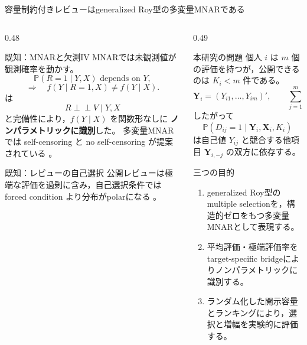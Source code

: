 \documentclass[aspectratio=169,10pt]{beamer}
\newcommand{\Prb}{\mathbb{P}}
\newcommand{\1}{\mathbf{1}}
\newcommand{\indep}{\mathrel{\perp\!\!\!\perp}}
\newcommand{\Y}{\bm{Y}}
\newcommand{\X}{\bm{X}}
\begin{document}
\begin{frame}[shrink=6]{容量制約付きレビューはgeneralized Roy型の多変量MNARである}
\begin{columns}[T,onlytextwidth]
\begin{column}{0.48\textwidth}
\begin{block}{既知：MNARと欠測IV}
\scriptsize
MNARでは未観測値が観測確率を動かす。
\[
\Prb(R=1\mid Y,X)\text{ depends on }Y,
\]
\[
\Rightarrow\quad f(Y\mid R=1,X)\ne f(Y\mid X).
\]
\textcite{dHaultfoeuille2010} は
\[
R\indep V\mid Y,X
\]
と完備性により，$f(Y\mid X)$ を関数形なしに
\textbf{ノンパラメトリックに識別}した。
多変量MNARでは self-censoring と no self-censoring が提案されている
\parencite{LiMiaoShpitserTchetgen2023,MalinskyShpitserTchetgen2022}。
\end{block}
\begin{block}{既知：レビューの自己選択}
\scriptsize
公開レビューは極端な評価を過剰に含み，自己選択条件では
forced condition より分布がpolarになる
\parencite{SchoenmuellerNetzerStahl2020,HuPavlouZhang2017}。
\end{block}
\end{column}
\begin{column}{0.49\textwidth}
\begin{alertblock}{本研究の問題}
\scriptsize
個人 $i$ は $m$ 個の評価を持つが，公開できるのは $K_i<m$ 件である。
\[
\Y_i=(Y_{i1},\ldots,Y_{im})',
\qquad
\sum_{j=1}^{m}D_{ij}=K_i.
\]
したがって
\[
\Prb(D_{ij}=1\mid\Y_i,\X_i,K_i)
\]
は自己値 $Y_{ij}$ と競合する他項目 $\Y_{i,-j}$ の双方に依存する。
\end{alertblock}
\begin{block}{三つの目的}
\scriptsize
\begin{enumerate}
\item generalized Roy型のmultiple selectionを，構造的ゼロをもつ多変量MNARとして表現する。
\item 平均評価・極端評価率をtarget-specific bridgeによりノンパラメトリックに識別する。
\item ランダム化した開示容量とランキングにより，選択と増幅を実験的に評価する。
\end{enumerate}
\end{block}
\end{column}
\end{columns}
\end{frame}
\end{document}
